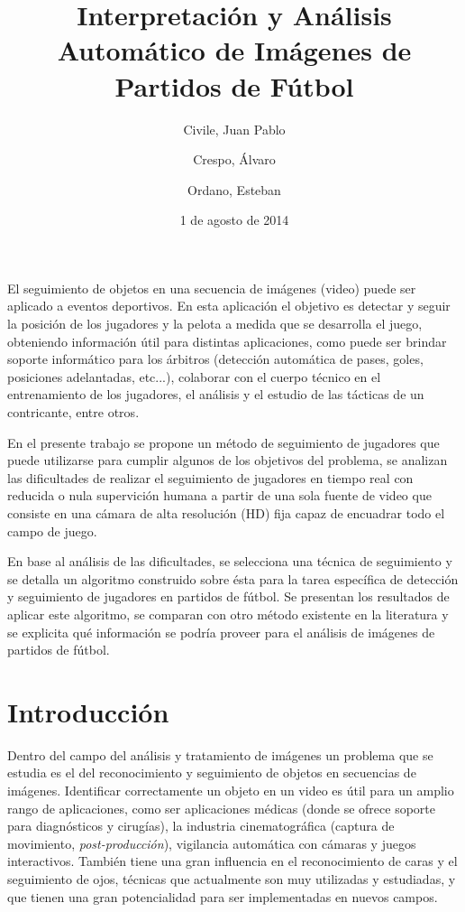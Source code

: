\documentclass[a4paper,11pt]{report}
\title{Interpretación y Análisis Automático de Imágenes de Partidos de Fútbol}
\date{1 de agosto de 2014}
\author{Civile, Juan Pablo \and Crespo, Álvaro \and Ordano, Esteban }
\begin{document}
\pagestyle{fancy}
\maketitle

\addvspace{3em}
\begin{customabstract}
El seguimiento de objetos en una secuencia de imágenes (video) puede ser
aplicado a eventos deportivos. En esta aplicación el objetivo es detectar y
seguir la posición de los jugadores y la pelota a medida
que se desarrolla el juego, obteniendo información útil para distintas
aplicaciones, como puede ser brindar soporte informático para los árbitros
(detección automática de pases, goles, posiciones adelantadas, etc...),
colaborar con el cuerpo técnico en el entrenamiento de los jugadores,
el análisis y el estudio de las tácticas de un contricante, entre otros.

En el presente trabajo se propone un método de seguimiento de jugadores que
puede utilizarse para cumplir algunos de los objetivos del problema, se
analizan las dificultades de realizar el seguimiento de jugadores en tiempo
real con reducida o nula supervición humana a partir de una sola fuente de
video que consiste en una cámara de alta resolución (HD) fija capaz de
encuadrar todo el campo de juego.

En base al análisis de las dificultades, se selecciona una técnica de
seguimiento y se detalla un algoritmo construido sobre ésta para la tarea
específica de detección y seguimiento de jugadores en partidos de fútbol. Se
presentan los resultados de aplicar este algoritmo, se comparan con otro método
existente en la literatura y se explicita qué información se podría proveer
para el análisis de imágenes de partidos de fútbol.
\end{customabstract}

\tableofcontents

\pagestyle{fancy}
\chapter*{Introducción}

Dentro del campo del análisis y tratamiento de imágenes un problema que se
estudia es el del reconocimiento y seguimiento de objetos en secuencias de
imágenes. Identificar correctamente un objeto en un video es útil para un
amplio rango de aplicaciones, como ser aplicaciones médicas (donde se ofrece
soporte para diagnósticos y cirugías), la industria cinematográfica (captura de
movimiento, \textit{post-producción}), vigilancia automática con cámaras y
juegos interactivos. También tiene una gran influencia en el reconocimiento de
caras y el seguimiento de ojos, técnicas que actualmente son muy utilizadas y
estudiadas, y que tienen una gran potencialidad para ser implementadas en
nuevos campos.
\end{document}

